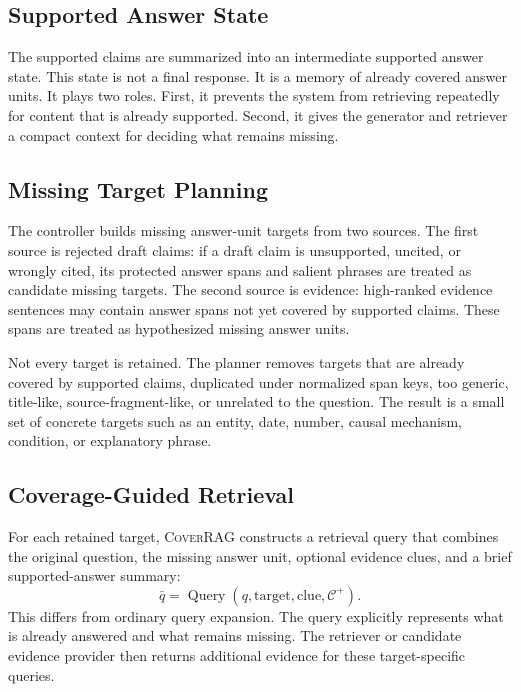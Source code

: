 \subsection{Supported Answer State}

The supported claims are summarized into an intermediate supported answer state. This state is not a final response. It is a memory of already covered answer units. It plays two roles. First, it prevents the system from retrieving repeatedly for content that is already supported. Second, it gives the generator and retriever a compact context for deciding what remains missing.

\subsection{Missing Target Planning}

The controller builds missing answer-unit targets from two sources. The first source is rejected draft claims: if a draft claim is unsupported, uncited, or wrongly cited, its protected answer spans and salient phrases are treated as candidate missing targets. The second source is evidence: high-ranked evidence sentences may contain answer spans not yet covered by supported claims. These spans are treated as hypothesized missing answer units.

Not every target is retained. The planner removes targets that are already covered by supported claims, duplicated under normalized span keys, too generic, title-like, source-fragment-like, or unrelated to the question. The result is a small set of concrete targets such as an entity, date, number, causal mechanism, condition, or explanatory phrase.

\subsection{Coverage-Guided Retrieval}

For each retained target, \textsc{CoverRAG} constructs a retrieval query that combines the original question, the missing answer unit, optional evidence clues, and a brief supported-answer summary:
\begin{equation}
    \bar{q}=\operatorname{Query}(q,\mathrm{target},\mathrm{clue},\mathcal{C}^{+}).
\end{equation}
This differs from ordinary query expansion. The query explicitly represents what is already answered and what remains missing. The retriever or candidate evidence provider then returns additional evidence for these target-specific queries.

